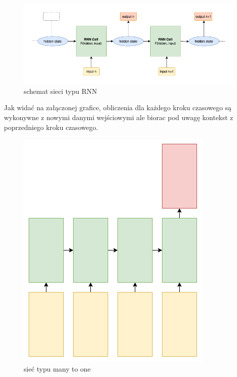 \begin{figure}[!ht]
\includegraphics[width=\linewidth]{./images/rnn.png}
\caption{schemat sieci typu RNN}
\label{fig:test3}
\end{figure}
Jak widać na załączonej grafice, obliczenia dla każdego kroku czasowego są wykonywne z nowymi danymi wejściowymi
ale biorac pod uwagę kontekst z poprzedniego kroku czasowego. 
\begin{figure}
\vspace{-4mm}
\includegraphics[width=\linewidth]{./images/many-to-one.png}
\caption{sieć typu many to one}
\label{fig:test3}
\vspace{-4mm}
\end{figure}
